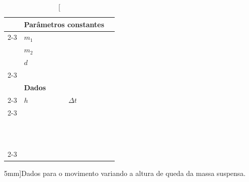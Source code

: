 \begin{table}[!ht]
\centering
\begin{tabular}{lp{25mm}p{25mm}l}
\toprule
	& \multicolumn{2}{l}{\textbf{Parâmetros constantes}} & \\
	\cmidrule{2-3}
	& $m_1$ \cellcolor[gray]{0.89} & \cellcolor[gray]{0.92} \\
	& $m_2$ \cellcolor[gray]{0.95} & \cellcolor[gray]{0.97} \\
	& $d$ \cellcolor[gray]{0.89} & \cellcolor[gray]{0.92} \\
	\cmidrule{2-3}
\\
	& \multicolumn{2}{l}{\textbf{Dados}} \\
	\cmidrule{2-3}
	& $h$ & $\Delta t$ & \\
	\cmidrule{2-3}
	& \cellcolor[gray]{0.89} & \cellcolor[gray]{0.92} \\
	& \cellcolor[gray]{0.95} & \cellcolor[gray]{0.97} \\
	& \cellcolor[gray]{0.89} & \cellcolor[gray]{0.92} \\
	& \cellcolor[gray]{0.95} & \cellcolor[gray]{0.97} \\
	& \cellcolor[gray]{0.89} & \cellcolor[gray]{0.92} \\
	& \cellcolor[gray]{0.95} & \cellcolor[gray]{0.97} \\
	& \cellcolor[gray]{0.89} & \cellcolor[gray]{0.92} \\
	& \cellcolor[gray]{0.95} & \cellcolor[gray]{0.97} \\
	& \cellcolor[gray]{0.89} & \cellcolor[gray]{0.92} \\
	& \cellcolor[gray]{0.95} & \cellcolor[gray]{0.97} \\
	& \cellcolor[gray]{0.89} & \cellcolor[gray]{0.92} \\
	& \cellcolor[gray]{0.95} & \cellcolor[gray]{0.97} \\
	\cmidrule{2-3}
\bottomrule
\end{tabular}
\caption[][5mm]{Dados para o movimento variando a altura de queda da massa suspensa.}
\label{TabelaDadosEnergiaMecanica3}
\end{table}
